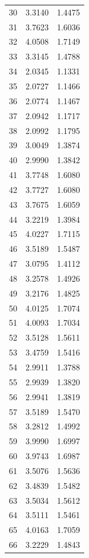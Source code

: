\documentclass[journal=jctcce,manuscript=article]{achemso}
\begin{document}
\begin{spacing}{1}
\begin{longtable}{lRR}
  30 & 3.3140 & 1.4475 \\
  31 & 3.7623 & 1.6036 \\
  32 & 4.0508 & 1.7149 \\
  33 & 3.3145 & 1.4788 \\
  34 & 2.0345 & 1.1331 \\
  35 & 2.0727 & 1.1466 \\
  36 & 2.0774 & 1.1467 \\
  37 & 2.0942 & 1.1717 \\
  38 & 2.0992 & 1.1795 \\
  39 & 3.0049 & 1.3874 \\
  40 & 2.9990 & 1.3842 \\
  41 & 3.7748 & 1.6080 \\
  42 & 3.7727 & 1.6080 \\
  43 & 3.7675 & 1.6059 \\
  44 & 3.2219 & 1.3984 \\
  45 & 4.0227 & 1.7115 \\
  46 & 3.5189 & 1.5487 \\
  47 & 3.0795 & 1.4112 \\
  48 & 3.2578 & 1.4926 \\
  49 & 3.2176 & 1.4825 \\
  50 & 4.0125 & 1.7074 \\
  51 & 4.0093 & 1.7034 \\
  52 & 3.5128 & 1.5611 \\
  53 & 3.4759 & 1.5416 \\
  54 & 2.9911 & 1.3788 \\
  55 & 2.9939 & 1.3820 \\
  56 & 2.9941 & 1.3819 \\
  57 & 3.5189 & 1.5470 \\
  58 & 3.2812 & 1.4992 \\
  59 & 3.9990 & 1.6997 \\
  60 & 3.9743 & 1.6987 \\
  61 & 3.5076 & 1.5636 \\
  62 & 3.4839 & 1.5482 \\
  63 & 3.5034 & 1.5612 \\
  64 & 3.5111 & 1.5461 \\
  65 & 4.0163 & 1.7059 \\
  66 & 3.2229 & 1.4843 \\
\end{longtable}


\end{spacing}
\end{document}
